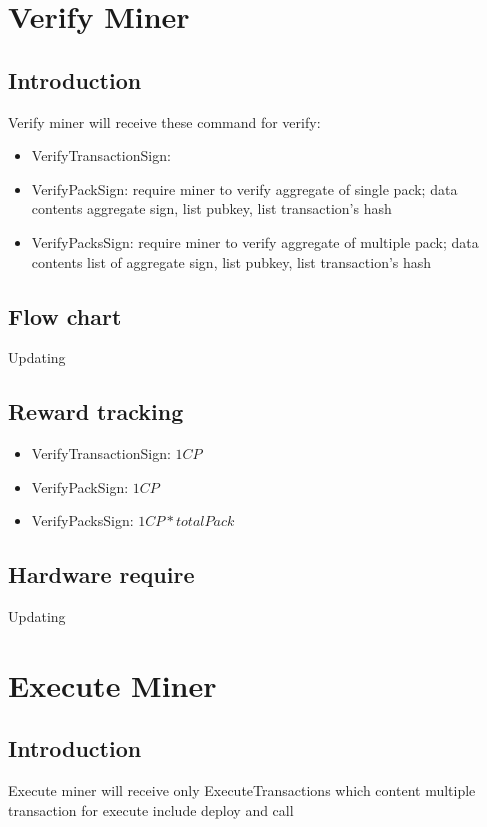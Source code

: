 \documentclass[a4paper, 11pt]{article}
\begin{document}
\pagebreak


\section{Verify Miner}

\subsection{Introduction}
Verify miner will receive these command for verify:
    \begin{itemize}
        \item VerifyTransactionSign: 
        \item VerifyPackSign: require miner to verify aggregate of single pack; data contents aggregate sign, list pubkey, list transaction's hash
        \item VerifyPacksSign: require miner to verify aggregate of multiple pack; data contents list of aggregate sign, list pubkey, list transaction's hash
    \end{itemize}
\subsection{Flow chart}
Updating
\subsection{Reward tracking}
\begin{itemize}
    \item VerifyTransactionSign: $1CP$
    \item VerifyPackSign: $1CP$
    \item VerifyPacksSign: $1CP * totalPack$
\end{itemize}

\subsection{Hardware require}
Updating
\pagebreak

\section{Execute Miner}
\subsection{Introduction}
Execute miner will receive only  ExecuteTransactions which content multiple transaction for execute include deploy and call
\end{document}
